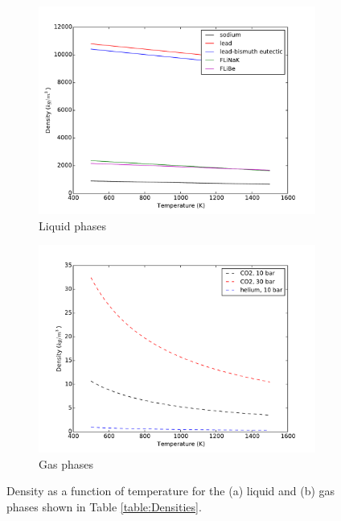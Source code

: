 \documentclass[10pt]{article}
\numberwithin{equation}{section} %
\begin{document}
\begin{figure}[H]
\centering
\begin{subfigure}{.6\textwidth}
  \centering
  \includegraphics[width=1.0\linewidth]{figures/Densities.pdf}
  \caption{Liquid phases}
\end{subfigure}
\begin{subfigure}{.6\textwidth}
  \centering
  \includegraphics[width=1.0\linewidth]{figures/DensitiesGases.pdf}
  \caption{Gas phases}
\end{subfigure}
\caption{Density as a function of temperature for the (a) liquid and (b) gas phases shown in Table \ref{table:Densities}.}
\label{fig:Densities}
\end{figure}
\end{document}
